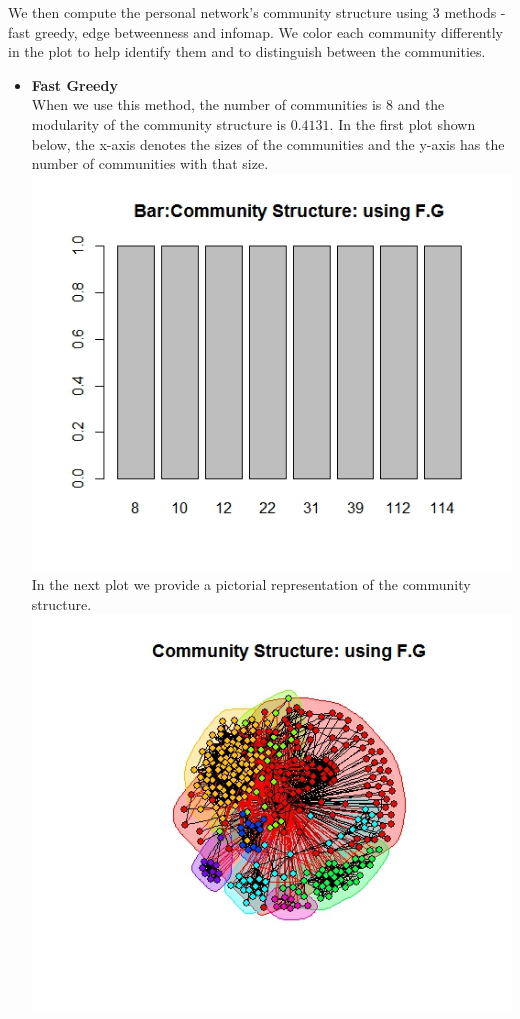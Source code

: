 \documentclass{article}
\begin{document}
We then compute the personal network's community structure using 3 methods - fast greedy,  edge betweenness and 
infomap. We color each community differently in the plot to help identify them and to distinguish between the communities.
\begin{itemize}
	\item \textbf{Fast Greedy}\\
	When we use this method, the number of communities is $8$ and the modularity of the community
	structure is $0.4131$.
	In the first plot shown below, the x-axis denotes the sizes of the communities and the y-axis has the number of communities with that size.\\
	\includegraphics[scale=0.4]{q4a} \\
	In the next plot we provide a pictorial representation of the community structure.\\
	\includegraphics[scale=0.4]{q4c} \\ 

\end{itemize}
\end{document}
